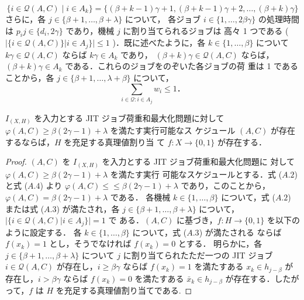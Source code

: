 \documentclass[12pt]{optlab-bachelor}
\begin{document}
\begin{equation}
  \{i \in \mathcal{Q}(A,C) \mid i \in A_k\} = \{(\beta + k -
  1)\gamma + 1, (\beta + k
  - 1)\gamma + 2,\ldots,(\beta + k)\gamma\} \tag{A.3}
\end{equation}
さらに，各 $j \in \{\beta + 1,\ldots, \beta + \lambda \}$ について，
各ジョブ $i \in \{1,\ldots, 2\beta \gamma \}$ の処理時間は $p_ij
\in \{d_i, 2\gamma \}$ であり，機械 $j$ に割り当てられるジョブは
高々 1 つである ( $|\{i \in \mathcal{Q}(A, C)\} | i \in A_j \}| \le 1$
)．既に述べたように，各 $k \in \{1,\ldots,\beta \}$ について
$k\gamma \in \mathcal{Q}(A,C)$ ならば $k\gamma \in A_k$ であり，
$(\beta + k) \gamma \in \mathcal{Q}(A,C)$ ならば，$(\beta +
k)\gamma \in A_k$ である．これらのジョブをのぞいた各ジョブの荷
重は 1 であることから，各 $j \in \{ \beta + 1,\ldots,
\lambda + \beta \}$ について，
\begin{equation}
  \displaystyle \sum_{i \in \mathcal{Q}:i \in A_j}w_i \le 1 ．\tag{A.4}
\end{equation}

\begin{lemma}\label{l_2}
  $I_{(X,H)}$ を入力とする JIT ジョブ荷重和最大化問題に対して
  $\varphi(A, C) \ge \beta(2\gamma − 1) + \lambda$ を満たす実行可能なス
  ケジュール $(A, C)$ が存在するならば，$H$ を充足する真理値割り当
  て $f : X \to \{0, 1\}$ が存在する．
\end{lemma}

\begin{proof}
  $(A, C)$ を $I_{(X,H)}$ を入力とする JIT ジョブ荷重和最大化問題に
  対して $\varphi(A, C) \ge \beta (2\gamma − 1) + \lambda$ を満たす実行
  可能なスケジュールとする．式 ($A.2$) と式 ($A.4$) より $\varphi(A, C
  )\le≤ \beta(2\gamma − 1) + \lambda$ であり，このことから，
  $\varphi(A, C) = \beta (2\gamma − 1) + \lambda$ である．
  各機械 $k \in \{1,\ldots, \beta\}$ について，式 ($A.2$) または式
  ($A.3$) が満たされ，各 $j \in \{ \beta + 1,\ldots,\beta + \lambda
  \}$ について，$|\{ i \in \mathcal{Q}(A,C) | i \in A_j \} | = 1$ で
  ある．$(A,C)$ に基づき，$f : H \to \{0,1\}$ を以下のように設定する．
  各 $k \in \{1,\ldots, \beta \}$ について，式 ($A.3$) が満たされる
  ならば $f(x_k) = 1$ とし，そうでなければ $f(x_k) = 0$ とする．
  明らかに，各 $j \in \{\beta + 1,\ldots,\beta + \lambda \}$ について
  $j$ に割り当てられたただ一つの JIT ジョブ $i \in
  \mathcal{Q}(A,C)$ が存在し，$i \ge \beta \gamma$ ならば $f(x_k)
  = 1$ を満たすある $x_k \in h_{j - \beta}$ が存在し，$i > \beta
  \gamma$ ならば $f(x_k) = 0$ を満たすある $\bar x_k \in h_{j -
  \beta}$ が存在する．したがって，$f$ は $H$ を充足する真理値割り当てである.
\end{proof}
\end{document}
